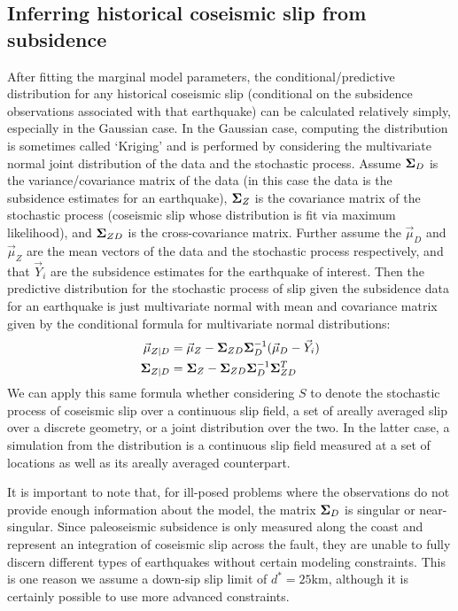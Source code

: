 {\subsection{Inferring historical coseismic slip from subsidence}
\label{inferringSlips}
After fitting the marginal model parameters, the conditional/predictive distribution for any historical coseismic slip (conditional on the subsidence observations associated with that earthquake) can be calculated relatively simply, especially in the Gaussian case.  In the Gaussian case, computing the distribution is sometimes called `Kriging' \citep{kriging, handbook} and is performed by considering the multivariate normal joint distribution of the data and the stochastic process.  Assume $\mathbf{\Sigma}_D$ is the variance/covariance matrix of the data (in this case the data is the subsidence estimates for an earthquake), $\mathbf{\Sigma}_Z$ is the covariance matrix of the stochastic process (coseismic slip whose distribution is fit via maximum likelihood), and $\mathbf{\Sigma}_{ZD}$ is the cross-covariance matrix.  Further assume the $\vec{\mu}_D$ and $\vec{\mu}_Z$ are the mean vectors of the data and the stochastic process respectively, and that $\vec{Y}_i$ are the subsidence estimates for the earthquake of interest.  Then the predictive distribution for the stochastic process of slip given the subsidence data for an earthquake is just multivariate normal with mean and covariance matrix given by the conditional formula for multivariate normal distributions:
\begin{align*}
\vec{\mu}_{Z \vert D} &= \vec{\mu}_Z - \mathbf{\Sigma}_{ZD} \mathbf{\Sigma}_{D}^{-1} (\vec{\mu}_D - \vec{Y}_i) \\
\mathbf{\Sigma}_{Z \vert D} &= \mathbf{\Sigma}_Z - \mathbf{\Sigma}_{ZD} \mathbf{\Sigma}_{D}^{-1} \mathbf{\Sigma}_{ZD}^T
\end{align*}
We can apply this same formula whether considering $S$ to denote the stochastic process of coseismic slip over a continuous slip field, a set of areally averaged slip over a discrete geometry, or a joint distribution over the two.  In the latter case, a simulation from the distribution is a continuous slip field measured at a set of locations as well as its areally averaged counterpart.

It is important to note that, for ill-posed problems where the observations do not provide enough information about the model, the matrix $\mathbf{\Sigma}_D$ is singular or near-singular.  Since paleoseismic subsidence is only measured along the coast and represent an integration of coseismic slip across the fault, they are unable to fully discern different types of earthquakes without certain modeling constraints.  This is one reason we assume a down-sip slip limit of $d^*=25$km, although it is certainly possible to use more advanced constraints.

}
